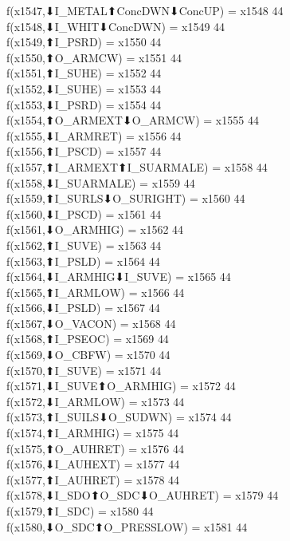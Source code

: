 f(x1547,⬇I_METAL⬆ConcDWN⬇ConcUP) = x1548 {44} \\
f(x1548,⬇I_WHIT⬇ConcDWN) = x1549 {44} \\
f(x1549,⬆I_PSRD) = x1550 {44} \\
f(x1550,⬆O_ARMCW) = x1551 {44} \\
f(x1551,⬆I_SUHE) = x1552 {44} \\
f(x1552,⬇I_SUHE) = x1553 {44} \\
f(x1553,⬇I_PSRD) = x1554 {44} \\
f(x1554,⬆O_ARMEXT⬇O_ARMCW) = x1555 {44} \\
f(x1555,⬇I_ARMRET) = x1556 {44} \\
f(x1556,⬆I_PSCD) = x1557 {44} \\
f(x1557,⬆I_ARMEXT⬆I_SUARMALE) = x1558 {44} \\
f(x1558,⬇I_SUARMALE) = x1559 {44} \\
f(x1559,⬆I_SURLS⬇O_SURIGHT) = x1560 {44} \\
f(x1560,⬇I_PSCD) = x1561 {44} \\
f(x1561,⬇O_ARMHIG) = x1562 {44} \\
f(x1562,⬆I_SUVE) = x1563 {44} \\
f(x1563,⬆I_PSLD) = x1564 {44} \\
f(x1564,⬇I_ARMHIG⬇I_SUVE) = x1565 {44} \\
f(x1565,⬆I_ARMLOW) = x1566 {44} \\
f(x1566,⬇I_PSLD) = x1567 {44} \\
f(x1567,⬇O_VACON) = x1568 {44} \\
f(x1568,⬆I_PSEOC) = x1569 {44} \\
f(x1569,⬇O_CBFW) = x1570 {44} \\
f(x1570,⬆I_SUVE) = x1571 {44} \\
f(x1571,⬇I_SUVE⬆O_ARMHIG) = x1572 {44} \\
f(x1572,⬇I_ARMLOW) = x1573 {44} \\
f(x1573,⬆I_SUILS⬇O_SUDWN) = x1574 {44} \\
f(x1574,⬆I_ARMHIG) = x1575 {44} \\
f(x1575,⬆O_AUHRET) = x1576 {44} \\
f(x1576,⬇I_AUHEXT) = x1577 {44} \\
f(x1577,⬆I_AUHRET) = x1578 {44} \\
f(x1578,⬇I_SDO⬆O_SDC⬇O_AUHRET) = x1579 {44} \\
f(x1579,⬆I_SDC) = x1580 {44} \\
f(x1580,⬇O_SDC⬆O_PRESSLOW) = x1581 {44} \\
